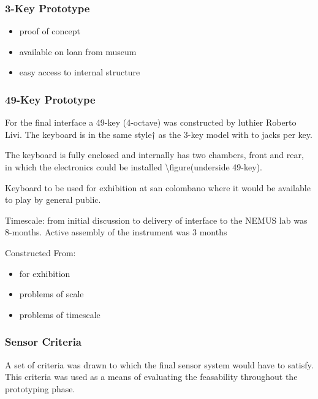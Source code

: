 \subsubsection{3-Key Prototype}\label{key-prototype}

\begin{itemize}
\item
  proof of concept
\item
  available on loan from museum
\item
  easy access to internal structure
\end{itemize}

\subsubsection{49-Key Prototype}\label{key-prototype-1}

For the final interface a 49-key (4-octave) was constructed by luthier
Roberto Livi. The keyboard is in the same style† as the 3-key model with
to jacks per key.

The keyboard is fully enclosed and internally has two chambers, front
and rear, in which the electronics could be installed
\textbackslash figure(underside 49-key).

Keyboard to be used for exhibition at san colombano where it would be
available to play by general public.

Timescale: from initial discussion to delivery of interface to the NEMUS
lab was 8-months. Active assembly of the instrument was 3 months

Constructed From:

\begin{itemize}
\item
  for exhibition
\item
  problems of scale
\item
  problems of timescale
\end{itemize}

\subsubsection{Sensor Criteria}\label{sensor-criteria}

A set of criteria was drawn to which the final sensor system would have
to satisfy. This criteria was used as a means of evaluating the
feasability throughout the prototyping phase.

